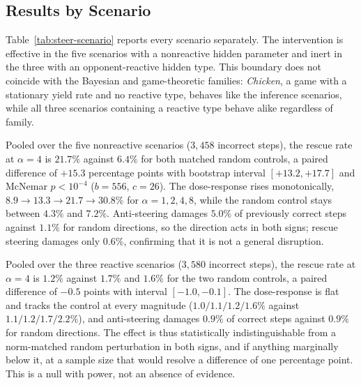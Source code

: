 \subsection{Results by Scenario}

Table~\ref{tab:steer-scenario} reports every scenario separately. The
intervention is effective in the five scenarios with a nonreactive hidden
parameter and inert in the three with an opponent-reactive hidden type. This
boundary does not coincide with the Bayesian and game-theoretic families:
\textit{Chicken}, a game with a stationary yield rate and no reactive type,
behaves like the inference scenarios, while all three scenarios containing a
reactive type behave alike regardless of family.

Pooled over the five nonreactive scenarios (\(3{,}458\) incorrect steps), the
rescue rate at \(\alpha=4\) is \(21.7\%\) against \(6.4\%\) for both matched
random controls, a paired difference of \(+15.3\) percentage points with
bootstrap interval \([+13.2,+17.7]\) and McNemar \(p<10^{-4}\)
(\(b=556\), \(c=26\)). The dose-response rises monotonically,
\(8.9\to13.3\to21.7\to30.8\%\) for \(\alpha=1,2,4,8\), while the random control
stays between \(4.3\%\) and \(7.2\%\). Anti-steering damages \(5.0\%\) of
previously correct steps against \(1.1\%\) for random directions, so the
direction acts in both signs; rescue steering damages only \(0.6\%\),
confirming that it is not a general disruption.

Pooled over the three reactive scenarios (\(3{,}580\) incorrect steps), the
rescue rate at \(\alpha=4\) is \(1.2\%\) against \(1.7\%\) and \(1.6\%\) for the
two random controls, a paired difference of \(-0.5\) points with interval
\([-1.0,-0.1]\). The dose-response is flat and tracks the control at every
magnitude (\(1.0/1.1/1.2/1.6\%\) against \(1.1/1.2/1.7/2.2\%\)), and
anti-steering damages \(0.9\%\) of correct steps against \(0.9\%\) for random
directions. The effect is thus statistically indistinguishable from a
norm-matched random perturbation in both signs, and if anything marginally
below it, at a sample size that would resolve a difference of one percentage
point. This is a null with power, not an absence of evidence.

